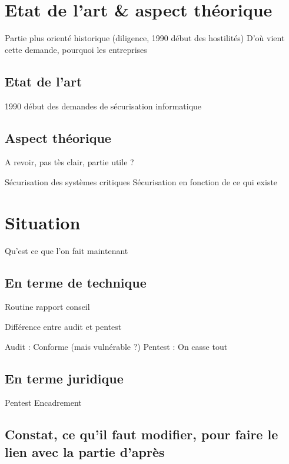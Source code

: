 \documentclass[a4paper]{memoir}
\begin{document}

\part{Etat de l'art \& aspect théorique}

Partie plus orienté historique (diligence, 1990 début des hostilités)
D'où vient cette demande, pourquoi les entreprises

\chapter{Etat de l'art}%

1990 début des demandes de sécurisation informatique

 

\chapter{Aspect théorique}

A revoir, pas tès clair, partie utile ?

Sécurisation des systèmes critiques
Sécurisation en fonction de ce qui existe 

\part{Situation}

Qu'est ce que l'on fait maintenant

\chapter{En terme de technique}

Routine
rapport
conseil

Différence entre audit et pentest

Audit : Conforme (mais vulnérable ?)
Pentest : On casse tout

\chapter{En terme juridique}

Pentest
Encadrement

\chapter{Constat, ce qu'il faut modifier, pour faire le lien avec la partie d'après}
\end{document}
